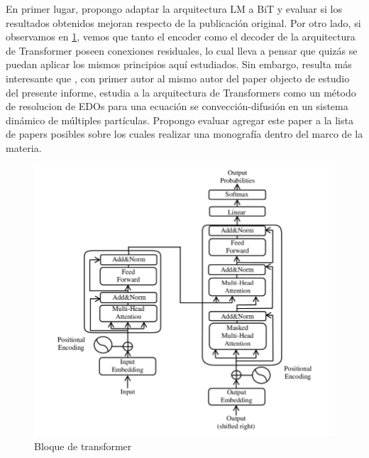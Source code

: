 \documentclass[titlepage,a4paper,oneside]{article}
\begin{document}
En primer lugar, propongo adaptar la arquitectura LM a BiT y evaluar si los resultados obtenidos mejoran respecto de la publicación original. Por otro lado, si observamos en \ref{transformer}, vemos que tanto el encoder como el decoder de la arquitectura de Transformer poseen conexiones residuales, lo cual lleva a pensar que quizás se puedan aplicar los mismos principios aquí estudiados. Sin embargo, resulta más interesante que \cite{lu2019understanding}, con primer autor al mismo autor del paper objecto de estudio del presente informe, estudia a la arquitectura de Transformers como un método de resolucion de EDOs para una ecuación se convección-difusión en un sistema dinámico de múltiples partículas. Propongo evaluar agregar este paper a la lista de papers posibles sobre los cuales realizar una monografía dentro del marco de la materia.

\begin{figure}[H]
\centering
\includegraphics[width=\textwidth]{images/TransformerBlock.png}
\caption{Bloque de transformer}
\label{transformer}
\end{figure}

\newpage

\printbibliography
\end{document}
